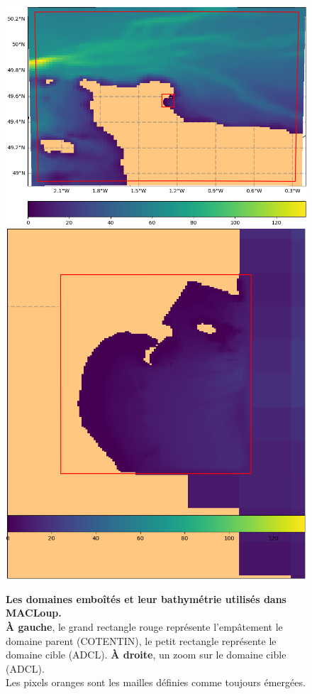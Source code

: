 \documentclass[10pt,a4paper,titlepage]{article}
\begin{document}
\begin{figure}[H]
	\centering
	\includegraphics[scale=0.4]{../images/COTENTIN_ADCL5.png}
	\includegraphics[scale=0.27]{../images/ADCL5.png}
	\caption{
		\textbf{Les domaines emboîtés et leur bathymétrie utilisés dans MACLoup.}\\
		\textbf{À gauche}, le grand rectangle rouge représente l'empâtement le domaine parent (COTENTIN), le petit rectangle représente le domaine cible (ADCL).
		\textbf{À droite}, un zoom sur le domaine cible (ADCL).
		\\
		Les pixels oranges sont les mailles définies comme toujours émergées.
	}
	\label{fig:imbrication}
\end{figure}
\end{document}

